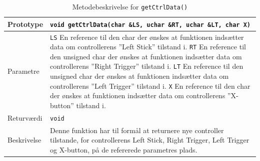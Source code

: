 \begin{table}[h]
\begin{tabularx}{\textwidth}{| L{2.5 cm} | Z |} \hline
Prototype 	& \texttt{void getCtrlData(char \&LS, uchar \&RT, uchar \&LT, char X)} \\\hline
Parametre 	& \texttt{LS}				\newline En reference til den char der ønskes at funktionen indsætter data om controllerens ''Left Stick'' tilstand i.				\newline \newline
			  \texttt{RT}				\newline En reference til den unsigned char der ønskes at funktionen indsætter data om controllerens ''Right Trigger'' tilstand i.\newline \newline
			  \texttt{LT}				\newline En reference til den unsigned char der ønskes at funktionen indsætter data om controllerens ''Left Trigger'' tilstand i.\newline \newline
			  \texttt{X}				\newline En reference til den char der ønskes at funktionen indsætter data om controllerens ''X-button'' tilstand i. \\\hline
Returværdi	& \texttt{void} 			\newline \\\hline
Beskrivelse	&  Denne funktion har til formål at returnere nye controller tilstande, for controllerens Left Stick, Right Trigger, Left Trigger og X-button, på de refererede parametres plads.\\\hline
\end{tabularx}
\caption{Metodebeskrivelse for \texttt{getCtrlData()}}
\label{table:met_getctrldata}
\end{table}